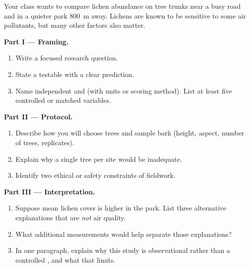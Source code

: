 \begin{problem}
\label{pb:g10:scientific-biology:1}
Your class wants to compare lichen abundance on tree trunks near a busy
road and in a quieter park \qty{800}{m} away. Lichens are known to be
sensitive to some air pollutants, but many other factors also matter.

\medskip
\noindent\textbf{Part I --- Framing.}
\begin{enumerate}
  \item Write a focused research question.
  \item State a testable  with a clear prediction.
  \item Name independent and  (with units or scoring
        method). List at least five controlled or matched variables.
\end{enumerate}

\medskip
\noindent\textbf{Part II --- Protocol.}
\begin{enumerate}
  \item Describe how you will choose trees and sample bark (height,
        aspect, number of trees, replicates).
  \item Explain why a single tree per site would be inadequate.
  \item Identify two ethical or safety constraints of fieldwork.
\end{enumerate}

\medskip
\noindent\textbf{Part III --- Interpretation.}
\begin{enumerate}
  \item Suppose mean lichen cover is higher in the park. List three
        alternative explanations that are \emph{not} air quality.
  \item What additional measurements would help separate those
        explanations?
  \item In one paragraph, explain why this study is observational
        rather than a controlled , and what that limits.
\end{enumerate}
\end{problem}
